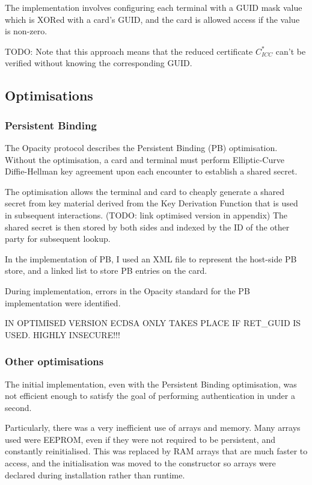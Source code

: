 \documentclass[12pt]{article}
\begin{document}
The implementation involves configuring each terminal with a GUID mask value which is XORed with a card's GUID, and the card is allowed access if the value is non-zero.

TODO: Note that this approach means that the reduced certificate $C_{ICC}^*$ can't be verified without knowing the corresponding GUID.


\subsection{Optimisations}
\label{sec:optimisations}
\subsubsection{Persistent Binding}
\label{subsec:pb}

The Opacity protocol describes the Persistent Binding (PB) optimisation. Without the optimisation, a card and terminal must perform Elliptic-Curve Diffie-Hellman key agreement upon each encounter to establish a shared secret. 

The optimisation allows the terminal and card to cheaply generate a shared secret from key material derived from the Key Derivation Function that is used in subsequent interactions. (TODO: link optimised version in appendix) The shared secret is then stored by both sides and indexed by the ID of the other party for subsequent lookup.

In the implementation of PB, I used an XML file to represent the host-side PB store, and a linked list to store PB entries on the card.

During implementation, errors in the Opacity standard for the PB implementation were identified. 


IN OPTIMISED VERSION ECDSA ONLY TAKES PLACE IF RET\_GUID IS USED. HIGHLY INSECURE!!!


\subsubsection{Other optimisations}
The initial implementation, even with the Persistent Binding optimisation, was not efficient enough to satisfy the goal of performing authentication in under a second. 

Particularly, there was a very inefficient use of arrays and memory. Many arrays used were EEPROM, even if they were not required to be persistent, and constantly reinitialised. This was replaced by RAM arrays that are much faster to access, and the initialisation was moved to the constructor so arrays were declared during installation rather than runtime. 
\end{document}
